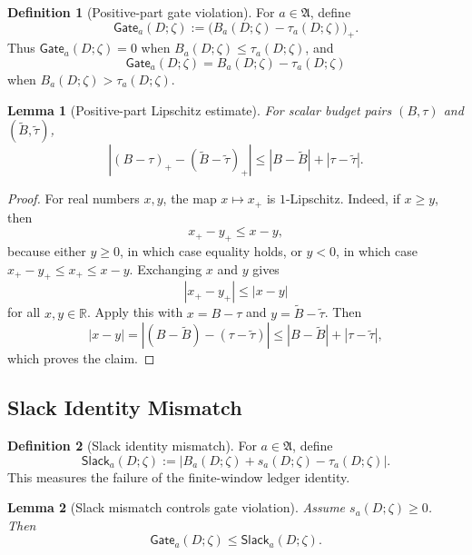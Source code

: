 \documentclass[11pt]{article}
\numberwithin{equation}{section}
\newtheorem{lemma}[lemma]{Lemma}
\theoremstyle{definition}
\newtheorem{definition}[definition]{Definition}
\theoremstyle{remark}
\newcommand{\R}{\mathbb{R}}
\newcommand{\Gate}{\mathsf{Gate}}
\newcommand{\Slack}{\mathsf{Slack}}
\newcommand{\Achan}{\mathfrak A}
\begin{document}
\begin{definition}[Positive-part gate violation]
\label{gs:def:positive-gate}
For \(a\in\Achan\), define
\[
    \Gate_a(D;\zeta)
    :=
    \bigl(B_a(D;\zeta)-\tau_a(D;\zeta)\bigr)_+.
\]
Thus \(\Gate_a(D;\zeta)=0\) when \(B_a(D;\zeta)\le\tau_a(D;\zeta)\), and
\[
    \Gate_a(D;\zeta)=B_a(D;\zeta)-\tau_a(D;\zeta)
\]
when \(B_a(D;\zeta)>\tau_a(D;\zeta)\).
\end{definition}

\begin{lemma}[Positive-part Lipschitz estimate]
\label{gs:lem:positive-part-lipschitz-target}
For scalar budget pairs \((B,\tau)\) and
\((\widetilde B,\widetilde\tau)\),
\[
    \left|
        (B-\tau)_+
        -
        (\widetilde B-\widetilde\tau)_+
    \right|
    \le
    |B-\widetilde B|+|\tau-\widetilde\tau|.
\]
\end{lemma}

\begin{proof}
For real numbers \(x,y\), the map \(x\mapsto x_+\) is \(1\)-Lipschitz.  Indeed,
if \(x\ge y\), then
\[
    x_+-y_+
    \le
    x-y,
\]
because either \(y\ge0\), in which case equality holds, or \(y<0\), in which
case \(x_+-y_+\le x_+\le x-y\).  Exchanging \(x\) and \(y\) gives
\[
    |x_+-y_+|\le |x-y|
\]
for all \(x,y\in\R\).  Apply this with \(x=B-\tau\) and
\(y=\widetilde B-\widetilde\tau\).  Then
\[
    |x-y|
    =
    |(B-\widetilde B)-(\tau-\widetilde\tau)|
    \le
    |B-\widetilde B|+|\tau-\widetilde\tau|,
\]
which proves the claim.
\end{proof}

\subsection{Slack Identity Mismatch}
\label{gs:sec:slack-mismatch}

\begin{definition}[Slack identity mismatch]
\label{gs:def:slack-mismatch}
For \(a\in\Achan\), define
\[
    \Slack_a(D;\zeta)
    :=
    |B_a(D;\zeta)+s_a(D;\zeta)-\tau_a(D;\zeta)|.
\]
This measures the failure of the finite-window ledger identity.
\end{definition}

\begin{lemma}[Slack mismatch controls gate violation]
\label{gs:lem:slack-controls-gate-target}
Assume \(s_a(D;\zeta)\ge0\).  Then
\[
    \Gate_a(D;\zeta)
    \le
    \Slack_a(D;\zeta).
\]
\end{lemma}
\end{document}
